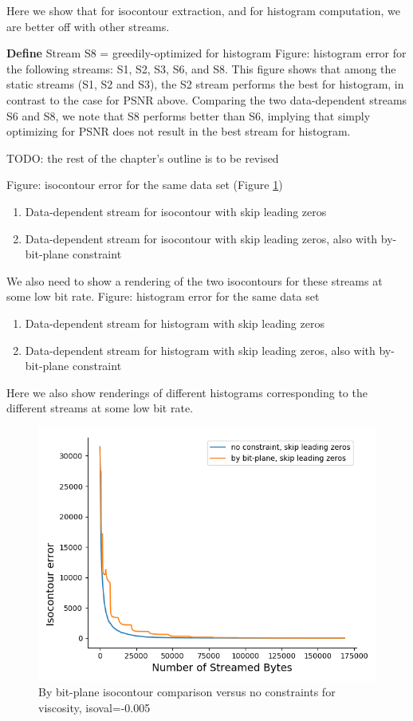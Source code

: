 Here we show that for isocontour extraction, and for histogram computation, we are better off with other streams.

\textbf{Define} Stream S8 = greedily-optimized for histogram
Figure: histogram error for the following streams: S1, S2, S3, S6, and S8. This figure shows that among the static streams (S1, S2 and S3), the S2 stream performs the best for histogram, in contrast to the case for PSNR above. Comparing the two data-dependent streams S6 and S8, we note that S8 performs better than S6, implying that simply optimizing for PSNR does not result in the best stream for histogram.

TODO: the rest of the chapter's outline is to be revised

Figure: isocontour error for the same data set (Figure \ref{fig:by_bit_plane_isocontour})
\begin{enumerate}
  \item Data-dependent stream for isocontour with skip leading zeros
  \item Data-dependent stream for isocontour with skip leading zeros, also with by-bit-plane constraint
\end{enumerate}

We also need to show a rendering of the two isocontours for these streams at some low bit rate.
Figure: histogram error for the same data set
\begin{enumerate}
  \item Data-dependent stream for histogram with skip leading zeros
  \item Data-dependent stream for histogram with skip leading zeros, also with by-bit-plane constraint
\end{enumerate}  
  Here we also show renderings of different histograms corresponding to the different streams at some low bit rate.

\begin{figure}
  \centering
  \includegraphics[width=0.8\linewidth]{resources/isocontour-error-by-bit-plane-viscosity.png}
  \caption {By bit-plane isocontour comparison versus no constraints for viscosity, isoval=-0.005}
  \label{fig:by_bit_plane_isocontour}
\end{figure}
